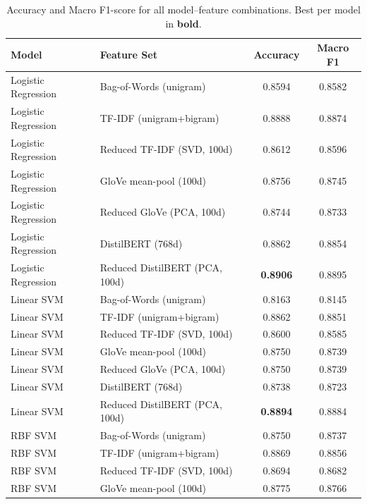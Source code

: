 \documentclass[11pt,a4paper]{article}
\begin{document}
\begin{table}[H]
\centering
\caption{Accuracy and Macro F1-score for all model--feature combinations. Best per model in \textbf{bold}.}
\label{tab:results}
\renewcommand{\arraystretch}{1.1}
\footnotesize
\begin{tabular}{llcc}
\toprule
\textbf{Model} & \textbf{Feature Set} & \textbf{Accuracy} & \textbf{Macro F1} \\
\midrule
Logistic Regression & Bag-of-Words (unigram)            & 0.8594 & 0.8582 \\
Logistic Regression & TF-IDF (unigram+bigram)            & 0.8888 & 0.8874 \\
Logistic Regression & Reduced TF-IDF (SVD, 100d)         & 0.8612 & 0.8596 \\
Logistic Regression & GloVe mean-pool (100d)             & 0.8756 & 0.8745 \\
Logistic Regression & Reduced GloVe (PCA, 100d)          & 0.8744 & 0.8733 \\
Logistic Regression & DistilBERT (768d)                  & 0.8862 & 0.8854 \\
Logistic Regression & Reduced DistilBERT (PCA, 100d)     & \textbf{0.8906} & 0.8895 \\
\midrule
Linear SVM          & Bag-of-Words (unigram)             & 0.8163 & 0.8145 \\
Linear SVM          & TF-IDF (unigram+bigram)            & 0.8862 & 0.8851 \\
Linear SVM          & Reduced TF-IDF (SVD, 100d)         & 0.8600 & 0.8585 \\
Linear SVM          & GloVe mean-pool (100d)             & 0.8750 & 0.8739 \\
Linear SVM          & Reduced GloVe (PCA, 100d)          & 0.8750 & 0.8739 \\
Linear SVM          & DistilBERT (768d)                  & 0.8738 & 0.8723 \\
Linear SVM          & Reduced DistilBERT (PCA, 100d)     & \textbf{0.8894} & 0.8884 \\
\midrule
RBF SVM             & Bag-of-Words (unigram)             & 0.8750 & 0.8737 \\
RBF SVM             & TF-IDF (unigram+bigram)            & 0.8869 & 0.8856 \\
RBF SVM             & Reduced TF-IDF (SVD, 100d)         & 0.8694 & 0.8682 \\
RBF SVM             & GloVe mean-pool (100d)             & 0.8775 & 0.8766 \\

\end{tabular}
\end{table}
\end{document}

